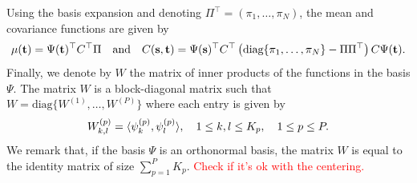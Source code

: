 Using the basis expansion and denoting $\Pi^\top = (\pi_1, \dots, \pi_N)$, the mean and covariance functions are given by
\begin{equation}
    \mu(\mathbf{t}) = \Psi(\mathbf{t})^\top C^\top\Pi \quad\text{and}\quad C(\mathbf{s}, \mathbf{t}) = \Psi(\mathbf{s})^\top C^\top \left(\text{diag}\{
        \pi_1, \dots, \pi_N\} - \Pi\Pi^\top\right)C \Psi(\mathbf{t}).
\end{equation}
Finally, we denote by $W$ the matrix of inner products of the functions in the basis $\Psi$. The matrix $W$ is a block-diagonal matrix such that $W = \text{diag}\{W^{(1)}, \dots, W^{(P)}\}$ where each entry is given by
\begin{equation}
    W_{k, l}^{(p)} = \langle\psi_k^{(p)}, \psi_l^{(p)}\rangle, \quad 1 \leq k, l \leq K_p, \quad 1 \leq p \leq P.
\end{equation}
We remark that, if the basis $\Psi$ is an orthonormal basis, the matrix $W$ is equal to the identity matrix of size $\sum_{p = 1}^P K_p$.
\textcolor{red}{Check if it's ok with the centering.}
